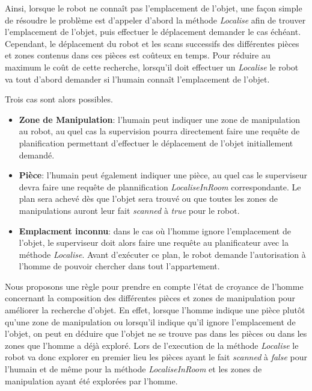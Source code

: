 \documentclass[a4paper,11pt,twoside]{StyleThese}
\begin{document}
Ainsi, lorsque le robot ne connaît pas l'emplacement de l'objet, une façon simple de résoudre le problème est d'appeler d'abord la méthode \textit{Localise} afin de trouver l'emplacement de l'objet, puis effectuer le déplacement demander le cas échéant. Cependant, le déplacement du robot et les scans successifs des différentes pièces et zones contenus dans ces pièces est coûteux en temps.
Pour réduire au maximum le coût de cette recherche, lorsqu'il doit effectuer un \textit{Localise} le robot va tout d'abord demander si l'humain connaît l'emplacement de l'objet.

Trois cas sont alors possibles.
\begin{itemize}
\item \textbf{Zone de Manipulation}: l'humain peut indiquer une zone de manipulation au robot, au quel cas la supervision pourra directement faire une requête de planification permettant d'effectuer le déplacement de l'objet initiallement demandé.

\item \textbf{Pièce}: l'humain peut également indiquer une pièce, au quel cas le superviseur devra faire une requête de plannification \textit{LocaliseInRoom} correspondante. Le plan sera achevé dès que l'objet sera trouvé ou que toutes les zones de manipulations auront leur fait \textit{scanned} à \textit{true} pour le robot.

\item \textbf{Emplacment inconnu}: dans le cas où l'homme ignore l'emplacement de l'objet, le superviseur doit alors faire une requête au planificateur avec la méthode \textit{Localise}. Avant d'exécuter ce plan, le robot demande l'autorisation à l'homme de pouvoir chercher dans tout l'appartement.
\end{itemize}  


Nous proposons une règle pour prendre en compte l'état de croyance de l'homme concernant la composition des différentes pièces et zones de manipulation pour améliorer la recherche d'objet.
En effet, lorsque l'homme indique une pièce plutôt qu'une zone de manipulation ou lorsqu'il indique qu'il ignore l'emplacement de l'objet, on peut en déduire que l'objet ne se trouve pas dans les pièces ou dans les zones que l'homme a déjà exploré. Lors de l'execution de la méthode \textit{Localise} le robot va donc explorer en premier lieu les pièces ayant le fait \textit{scanned} à \textit{false} pour l'humain et de même pour la méthode \textit{LocaliseInRoom} et les zones de manipulation ayant été explorées par l'homme.
\end{document}
